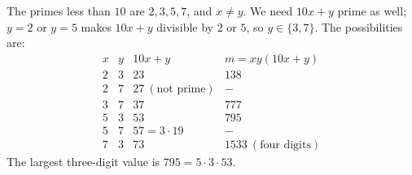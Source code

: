 The primes less than $10$ are $2,3,5,7$, and $x\ne y$. We need $10x+y$ prime as well; $y=2$ or $y=5$ makes $10x+y$ divisible by $2$ or $5$, so $y\in\{3,7\}$. The possibilities are:
\[
\begin{array}{c|c|c|c}
x & y & 10x+y & m=xy(10x+y)\\\hline
2 & 3 & 23 & 138\\
2 & 7 & 27\ (\text{not prime}) & -\\
3 & 7 & 37 & 777\\
5 & 3 & 53 & 795\\
5 & 7 & 57=3\cdot19 & -\\
7 & 3 & 73 & 1533\ (\text{four digits})
\end{array}
\]
The largest three-digit value is $\boxed{795}=5\cdot3\cdot53$.
